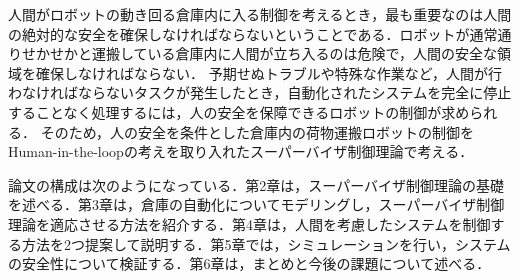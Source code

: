 人間がロボットの動き回る倉庫内に入る制御を考えるとき，最も重要なのは人間の絶対的な安全を確保しなければならないということである．ロボットが通常通りせかせかと運搬している倉庫内に人間が立ち入るのは危険で，人間の安全な領域を確保しなければならない\cite{JISD6802}．
予期せぬトラブルや特殊な作業など，人間が行わなければならないタスクが発生したとき，自動化されたシステムを完全に停止することなく処理するには，人の安全を保障できるロボットの制御が求められる．
そのため，人の安全を条件とした倉庫内の荷物運搬ロボットの制御をHuman-in-the-loopの考えを取り入れたスーパーバイザ制御理論で考える．

論文の構成は次のようになっている．第2章は，スーパーバイザ制御理論の基礎を述べる．第3章は，倉庫の自動化についてモデリングし，スーパーバイザ制御理論を適応させる方法を紹介する．第4章は，人間を考慮したシステムを制御する方法を2つ提案して説明する．第5章では，シミュレーションを行い，システムの安全性について検証する．第6章は，まとめと今後の課題について述べる．